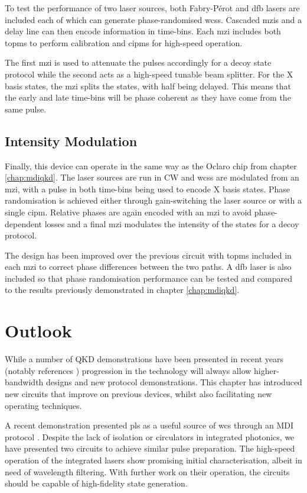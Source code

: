 To test the performance of two laser sources, both Fabry-P\'{e}rot and \ac{dfb} lasers are included each of which can generate phase-randomised \acp{wcs}. Cascaded \acp{mzi} and a delay line can then encode information in time-bins. Each \ac{mzi} includes both \acp{topm} to perform calibration and \acp{cipm} for high-speed operation. 

The first \ac{mzi} is used to attenuate the pulses accordingly for a decoy state protocol while the second acts as a high-speed tunable beam splitter. For the X basis states, the \ac{mzi} splits the states, with half being delayed. This means that the early and late time-bins will be phase coherent as they have come from the same pulse. 

\subsection{Intensity Modulation}

Finally, this device can operate in the same way as the Oclaro chip from chapter \ref{chap:mdiqkd}. The laser sources are run in \ac{CW} and \acp{wcs} are modulated from an \ac{mzi}, with a pulse in both time-bins being used to encode X basis states. Phase randomisation is achieved either through gain-switching the laser source or with a single \ac{cipm}. Relative phases are again encoded with an \ac{mzi} to avoid phase-dependent losses and a final \ac{mzi} modulates the intensity of the states for a decoy protocol. 

The design has been improved over the previous circuit with \acp{topm} included in each \ac{mzi} to correct phase differences between the two paths. A \ac{dfb} laser is also included so that phase randomisation performance can be tested and compared to the results previously demonstrated in chapter \ref{chap:mdiqkd}.

\section{Outlook}

While a number of \ac{QKD} demonstrations have been presented in recent years (notably references \cite{Sibson2017InP, Sibson2017Si, semenenko2019mdi, zhang2019integrated, ma2016silicon}) progression in the technology will always allow higher-bandwidth designs and new protocol demonstrations. This chapter has introduced new circuits that improve on previous devices, whilst also facilitating new operating techniques.

A recent demonstration presented \ac{pls} as a useful source of \ac{wcs} through an \ac{MDI} protocol \cite{Comandar2016}. Despite the lack of isolation or circulators in integrated photonics, we have presented two circuits to achieve similar pulse preparation. The high-speed operation of the integrated lasers show promising initial characterisation, albeit in need of wavelength filtering. With further work on their operation, the circuits should be capable of high-fidelity state generation.

